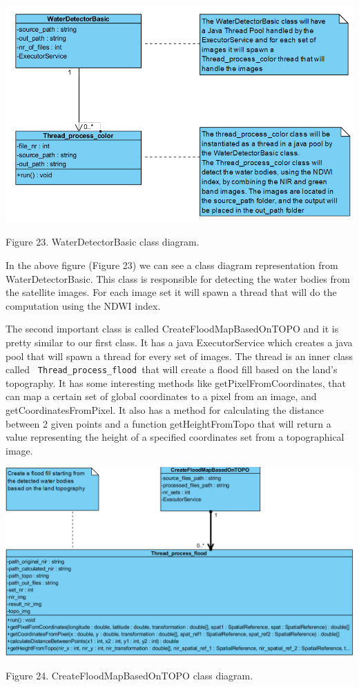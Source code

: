 \documentclass[12pt, a4paper]{report}
\begin{document}
\medskip
\includegraphics[scale=0.6, center]{WaterDetectorBasic_class.png}
\begin{center}
Figure 23. WaterDetectorBasic class diagram.
\end{center}
\par 

In the above figure (Figure 23) we can see a class diagram representation from WaterDetectorBasic. This class is responsible for detecting the water bodies from the satellite images. For each image set it will spawn a thread that will do the computation using the NDWI index.
\par 

The second important class is called CreateFloodMapBasedOnTOPO and it is pretty similar to our first class. It has a java ExecutorService which creates a java pool that will spawn a thread for every set of images. The thread is an inner class called \texttt{ Thread\_process\_flood }that will create a flood fill based on the land's topography. It has some interesting methods like getPixelFromCoordinates, that can map a certain set of global coordinates to a pixel from an image, and getCoordinatesFromPixel. It also has a method for calculating the distance between 2 given points and a function getHeightFromTopo that will return a value representing the height of a specified coordinates set from a topographical image.

\bigskip
\includegraphics[scale=0.55, center]{CreateFloodMapBasedOnTOPO_class.png}
\begin{center}
Figure 24. CreateFloodMapBasedOnTOPO class diagram.
\end{center}
\par 
\end{document}
